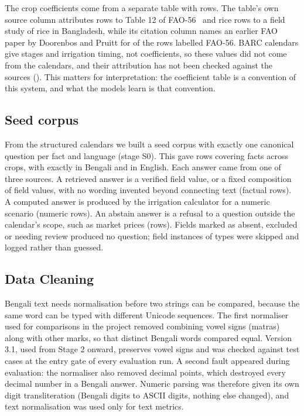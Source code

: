 The crop coefficients come from a separate table with \KcRows rows. The table's own source column attributes \KcRowsFao rows to Table 12 of FAO-56~\cite{allen1998fao56} and \KcRowsIslam rice rows to a field study of rice in Bangladesh, while its citation column names an earlier FAO paper by Doorenbos and Pruitt for \KcFaoRowsCitingDoorenbos of the rows labelled FAO-56. BARC calendars give stages and irrigation timing, not coefficients, so these values did not come from the calendars, and their attribution has not been checked against the sources (). This matters for interpretation: the coefficient table is a convention of this system, and what the models learn is that convention.

\subsection{Seed corpus}
\label{sec:seed-corpus}

From the structured calendars we built a seed corpus with exactly one canonical question per fact and language (stage S0). This gave \SeedRows rows covering \SeedFacts facts across \SeedCrops crops, with exactly \SeedRowsBn in Bengali and \SeedRowsBn in English. Each answer came from one of three sources. A retrieved answer is a verified field value, or a fixed composition of field values, with no wording invented beyond connecting text (\SeedFactual factual rows). A computed answer is produced by the irrigation calculator for a numeric scenario (\SeedNumeric numeric rows). An abstain answer is a refusal to a question outside the calendar's scope, such as market prices (\SeedAbstain rows). Fields marked as absent, excluded or needing review produced no question; \SeedSkippedInstances field instances of \SeedSkippedFieldTypes types were skipped and logged rather than guessed.

\subsection{Data Cleaning}
\label{sec:cleaning}

Bengali text needs normalisation before two strings can be compared, because the same word can be typed with different Unicode sequences. The first normaliser used for comparisons in the project removed combining vowel signs (matras) along with other marks, so that distinct Bengali words compared equal. Version 3.1, used from Stage 2 onward, preserves vowel signs and was checked against \BnNormCases test cases at the entry gate of every evaluation run. A second fault appeared during evaluation: the normaliser also removed decimal points, which destroyed every decimal number in a Bengali answer. Numeric parsing was therefore given its own digit transliteration (Bengali digits to ASCII digits, nothing else changed), and text normalisation was used only for text metrics.

